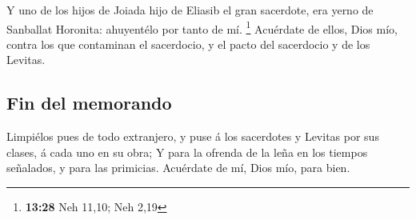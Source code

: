  Y uno de los hijos de Joiada hijo de Eliasib el gran
sacerdote, era yerno de Sanballat Horonita: ahuyentélo por tanto de mí.
\footnote{\textbf{13:28} Neh 11,10; Neh 2,19}  Acuérdate
de ellos, Dios mío, contra los que contaminan el sacerdocio, y el pacto
del sacerdocio y de los Levitas.

\hypertarget{fin-del-memorando}{%
\subsection{Fin del memorando}\label{fin-del-memorando}}

 Limpiélos pues de todo extranjero, y puse á los
sacerdotes y Levitas por sus clases, á cada uno en su obra;
 Y para la ofrenda de la leña en los tiempos señalados, y
para las primicias. Acuérdate de mí, Dios mío, para bien.

